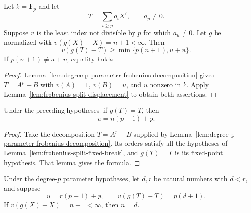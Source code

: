 \begin{lemma}
\label{lem:degree-p-parameter-displacement}
\leanok
Let $k=\mathbf F_p$ and let
\[
 T=\sum_{i\ge p}a_iX^i,\qquad a_p\ne0.
\]
Suppose $u$ is the least index not divisible by $p$ for which $a_u\ne0$.
Let $g$ be normalized with $v(g(X)-X)=n+1<\infty$.
Then
\[
 v(g(T)-T)\ge\min\{p(n+1),u+n\}.
\]
If $p(n+1)\ne u+n$, equality holds.
\end{lemma}

\begin{proof}
Lemma~\ref{lem:degree-p-parameter-frobenius-decomposition}
gives $T=A^p+B$ with $v(A)=1$, $v(B)=u$, and $u$ nonzero
in $k$. Apply Lemma~\ref{lem:frobenius-split-displacement}
to obtain both assertions.
\end{proof}

\begin{lemma}
\label{lem:camina-four-depth-equation}
\leanok
Under the preceding hypotheses, if $g(T)=T$, then
\[
 u=n(p-1)+p.
\]
\end{lemma}

\begin{proof}
Take the decomposition $T=A^p+B$ supplied by
Lemma~\ref{lem:degree-p-parameter-frobenius-decomposition}.
Its orders satisfy all the hypotheses of
Lemma~\ref{lem:frobenius-split-fixed-break}, and $g(T)=T$ is
its fixed-point hypothesis. That lemma gives the formula.
\end{proof}

\begin{lemma}
\label{lem:camina-five-depth-preservation}
\leanok
Under the degree-$p$ parameter hypotheses, let $d,r$ be natural
numbers with $d<r$, and suppose
\[
 u=r(p-1)+p,\qquad v(g(T)-T)=p(d+1).
\]
If $v(g(X)-X)=n+1<\infty$, then $n=d$.
\end{lemma}

